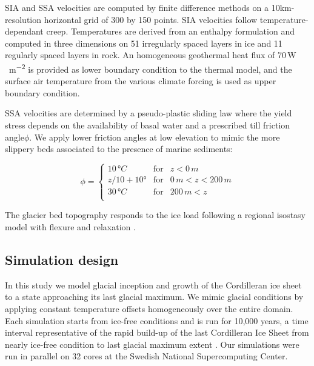 SIA and SSA velocities are computed by finite difference methods on a 10km-resolution horizontal grid of 300 by 150 points. SIA velocities follow temperature-dependant creep. Temperatures are derived from an enthalpy formulation \citep{aschwanden-etal-2012} and computed in three dimensions on 51 irregularly spaced layers in ice and 11 regularly spaced layers in rock. An homogeneous geothermal heat flux of 70\,\unit{W\,m^{-2}} is provided as lower boundary condition to the thermal model, and the surface air temperature from the various climate forcing is used as upper boundary condition.

SSA velocities are determined by a pseudo-plastic sliding law where the yield stress depends on the availability of basal water and a prescribed till friction angle$\phi$. We apply lower friction angles at low elevation to mimic the more slippery beds associated to the presence of marine sediments:

\begin{equation}
	\phi = \left\{\begin{array}{llc}
		10\,\unit{\degree C} & \mathrm{for} &               z<  0\,\unit{m} \\
		z/10 + 10°           & \mathrm{for} &   0\,\unit{m}<z<200\,\unit{m} \\
		30\,\unit{\degree C} & \mathrm{for} & 200\,\unit{m}<z               \\
	\end{array}\right.
\end{equation}

The glacier bed topography responds to the ice load following a regional isostasy model with flexure and relaxation \citep{lingle-clark-1985}.

\subsection{Simulation design}

In this study we model glacial inception and growth of the Cordilleran ice sheet to a state approaching its last glacial maximum. We mimic glacial conditions by applying constant temperature offsets homogeneously over the entire domain. Each simulation starts from ice-free conditions and is run for 10,000 years, a time interval representative of the rapid build-up of the last Cordilleran Ice Sheet from nearly ice-free condition to last glacial maximum extent \needref. Our simulations were run in parallel on 32 cores at the Swedish National Supercomputing Center.

